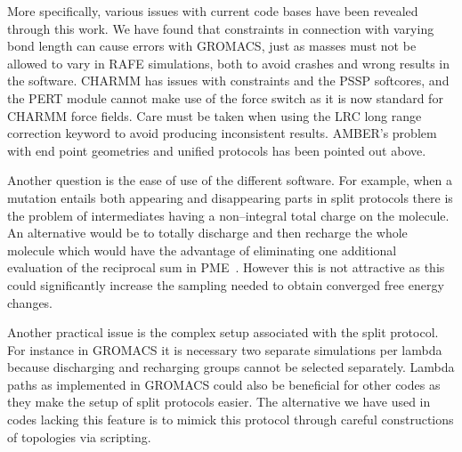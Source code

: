 \documentclass[journal=jctcce,manuscript=article]{achemso}
\begin{document}
More specifically, various issues with current code bases have been revealed through this work.  
We have found that constraints in connection with varying bond length can cause errors with GROMACS, just as masses must not be allowed to vary in RAFE simulations, both to avoid crashes and wrong results in the 
software.  CHARMM has issues with constraints and the PSSP softcores, and the PERT module cannot make use of the force switch as it is now standard for CHARMM force fields. Care must be taken when using the LRC long range correction keyword to avoid producing inconsistent results.  AMBER's problem with end point geometries and unified protocols has been pointed out above.

Another question is the ease of use of the different software.  For example, when a mutation entails both appearing and disappearing parts in split 
protocols there is the problem of intermediates having a non--integral total 
charge on the molecule.  An alternative would be to totally discharge and then 
recharge the whole molecule which 
would have the advantage of eliminating one additional evaluation of the reciprocal sum in PME~\cite{doi:10.1021/ct400340s}.
 However this is not attractive as this could significantly increase the sampling needed to obtain converged free energy changes.

 Another practical issue is the complex setup associated with the split protocol. For instance in GROMACS it is necessary  two separate simulations per lambda because discharging and recharging groups cannot be selected separately.
Lambda paths as implemented in GROMACS could also be beneficial for other codes as they make the setup of split protocols easier.  The alternative we have used in codes lacking this feature is to mimick this protocol through careful constructions of 
topologies via scripting.  
%
\end{document}
